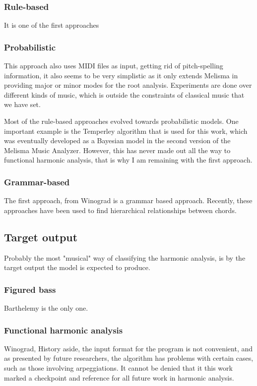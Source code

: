     \subsubsection{Rule-based}
    It is one of the first approaches
    \subsubsection{Probabilistic}

    This approach also uses MIDI files as input, getting rid of pitch-spelling information, it also seems to be very simplistic as it only extends Melisma in providing major or minor modes for the root analysis. Experiments are done over different kinds of music, which is outside the constraints of classical music that we have set.

    Most of the rule-based approaches evolved towards probabilistic models. One important example is the Temperley algorithm that is used for this work, which was eventually developed as a Bayesian model in the second version of the Melisma Music Analyzer. However, this has never made out all the way to functional harmonic analysis, that is why I am remaining with the first approach.
    \subsubsection{Grammar-based}
    The first approach, from Winograd is a grammar based approach. Recently, these approaches have been used to find hierarchical relationships between chords.
  \subsection{Target output}
  Probably the most "musical" way of classifying the harmonic analysis, is by the target output the model is expected to produce.
    \subsubsection{Figured bass}
    Barthelemy is the only one.
    \subsubsection{Functional harmonic analysis}
    Winograd, History aside, the input format for the program is not convenient, and as presented by future researchers, the algorithm has problems with certain cases, such as those involving arpeggiations. It cannot be denied that it this work marked a checkpoint and reference for all future work in harmonic analysis.

